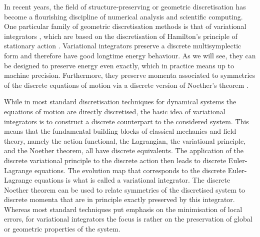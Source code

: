 \documentclass[12pt,a4paper,reqno]{article}
\begin{document}
In recent years, the field of structure-preserving or geometric discretisation 
\cite{Christiansen:2011, HairerLubichWanner:2006, BuddPiggot:2000} has become a flourishing discipline of numerical analysis and scientific computing. One particular family of geometric discretisation methods is that of variational integrators \cite{WendlandtMarsden:1997, MarsdenWendlandt:1997, MarsdenPatrick:1998, KouranbaevaShkoller:2000, MarsdenWest:2001, Lew:2004b, Lew:2004a}, which are based on the discretisation of Hamilton's principle of stationary action \cite{JoseSaletan:1998, Arnold:1989, Holm:2009, MarsdenRatiu:2002, AbrahamMarsden:1978}.
Variational integrators preserve a discrete multisymplectic form and therefore have good longtime energy behaviour. As we will see, they can be designed to preserve energy even exactly, which in practice means up to machine precision.
Furthermore, they preserve momenta associated to symmetries of the discrete equations of motion via a discrete version of Noether's theorem \cite{Noether:1918, KosmannSchwarzbach:2010}.

While in most standard discretisation techniques for dynamical systems the equations of motion are directly discretised,
the basic idea of variational integrators is to construct a discrete counterpart to the considered system.
This means that the fundamental building blocks of classical mechanics and field theory, namely the action functional, the Lagrangian,
the variational principle, and the Noether theorem, all have discrete equivalents.
The application of the discrete variational principle to the discrete action then leads to discrete Euler-Lagrange equations.
The evolution map that corresponds to the discrete Euler-Lagrange equations is what is called a variational integrator.
The discrete Noether theorem can be used to relate symmetries of the discretised system to discrete momenta
that are in principle exactly preserved by this integrator.
Whereas most standard techniques put emphasis on the minimisation of local errors, for variational
integrators the focus is rather on the preservation of global or geometric properties of the system.
\end{document}
